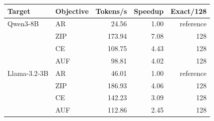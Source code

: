 \begin{tabular}{llrrr}
\toprule
Target & Objective & Tokens/s & Speedup & Exact/128 \\
\midrule
Qwen3-8B & AR & 24.56 & 1.00 & reference \\
 & ZIP & 173.94 & 7.08 & 128 \\
 & CE & 108.75 & 4.43 & 128 \\
 & AUF & 98.81 & 4.02 & 128 \\
\midrule
Llama-3.2-3B & AR & 46.01 & 1.00 & reference \\
 & ZIP & 186.93 & 4.06 & 128 \\
 & CE & 142.23 & 3.09 & 128 \\
 & AUF & 112.86 & 2.45 & 128 \\
\bottomrule
\end{tabular}
